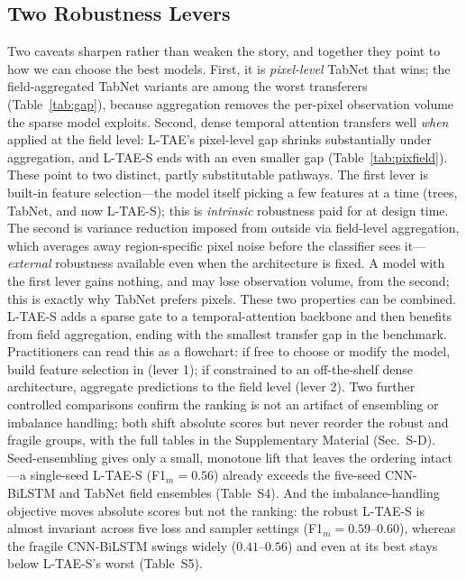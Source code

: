 \documentclass[preprint,authoryear]{elsarticle}
\begin{document}
\subsection{Two Robustness Levers}
Two caveats sharpen rather than weaken the story, and together they point to how we can choose the best models. First, it is \emph{pixel-level} TabNet that wins; the field-aggregated TabNet variants are among the worst transferers (Table~\ref{tab:gap}), because aggregation removes the per-pixel observation volume the sparse model exploits. Second, dense temporal attention transfers well \emph{when} applied at the field level: L-TAE's pixel-level gap shrinks substantially under aggregation, and L-TAE-S ends with an even smaller gap (Table~\ref{tab:pixfield}). These point to two distinct, partly substitutable pathways. The first lever is built-in feature selection---the model itself picking a few features at a time (trees, TabNet, and now L-TAE-S); this is \emph{intrinsic} robustness paid for at design time. The second is variance reduction imposed from outside via field-level aggregation, which averages away region-specific pixel noise before the classifier sees it---\emph{external} robustness available even when the architecture is fixed. A model with the first lever gains nothing, and may lose observation volume, from the second; this is exactly why TabNet prefers pixels. These two properties can be combined. L-TAE-S adds a sparse gate to a temporal-attention backbone and then benefits from field aggregation, ending with the smallest transfer gap in the benchmark. Practitioners can read this as a flowchart: if free to choose or modify the model, build feature selection in (lever 1); if constrained to an off-the-shelf dense architecture, aggregate predictions to the field level (lever 2). Two further controlled comparisons confirm the ranking is not an artifact of ensembling or imbalance handling; both shift absolute scores but never reorder the robust and fragile groups, with the full tables in the Supplementary Material (Sec.~S-D). Seed-ensembling gives only a small, monotone lift that leaves the ordering intact---a single-seed L-TAE-S (F1$_m=0.56$) already exceeds the five-seed CNN-BiLSTM and TabNet field ensembles (Table~S4). And the imbalance-handling objective moves absolute scores but not the ranking: the robust L-TAE-S is almost invariant across five loss and sampler settings (F1$_m=0.59$--$0.60$), whereas the fragile CNN-BiLSTM swings widely ($0.41$--$0.56$) and even at its best stays below L-TAE-S's worst (Table~S5).
\end{document}
